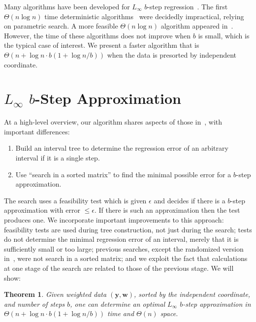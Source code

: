 \documentclass[11pt]{article}
\newtheorem{theorem}{Theorem}
\renewcommand{\vec}[1]{\ensuremath{\mathbf{#1}}}
\newcommand{\data}{\ensuremath{(\vec{y},\vec{w})}}
\begin{document}
Many algorithms have been developed for $L_\infty$ $b$-step regression~\cite{ChenWangPiecewise2013,ChenWangnlogn2013,DiazBanezLinearDecide,FournierVigneronLinftyStep,FournierVigneronLinftyParametric,FulopPrillLinftyStep,GuhaShimLinftyHistogram,JQReducedIso_IF2012,KarrasetalHistogramDuality,LiuRandomizedLinftyReduced,MaysterLopezStep}.
The first $\Theta(n \log n)$ time deterministic algorithms~\cite{FournierVigneronLinftyParametric,JQReducedIso_IF2012} were decidedly impractical, relying on parametric search.
A more feasible $\Theta(n \log n)$ algorithm appeared in~\cite{ChenWangnlogn2013}.
However, the time of these algorithms does not improve when $b$ is small, which is the typical case of interest.
We present a faster algorithm that is $\Theta(n + \log n \cdot b(1+\log n/b))$ when the data is presorted by independent coordinate.


\vspace*{-0.055in}
\section{$L_\infty$ $b$-Step Approximation} \label{sec:Linfty}
\vspace*{-0.055in}

At a high-level overview, our algorithm shares aspects of those in~\cite{ChenWangPiecewise2013,FournierVigneronLinftyStep,GuhaShimLinftyHistogram}, with important differences:
\vspace*{-0.05in}
\begin{enumerate}
\item Build an interval tree to determine the regression error of an arbitrary interval if it is a single step.
\vspace*{-0.05in}
\item Use ``search in a sorted matrix'' to find the minimal possible error for a $b$-step approximation.
\end{enumerate}
\vspace*{-0.05in}
The search uses a feasibility test which is given $\epsilon$ and decides if there is a $b$-step approximation with error $\leq \epsilon$.
If there is such an approximation then the test produces one.
We incorporate important improvements to this approach: feasibility tests are used during tree construction, not just during the search; tests do not determine the minimal regression error of an interval, merely that it is sufficiently small or too large; previous searches, except the randomized version in~\cite{LiuRandomizedLinftyReduced}, were not search in a sorted matrix; and we exploit the fact that calculations at one stage of the search are related to those of the previous stage.
We will show:
\begin{theorem} \label{thm:mainresult}
Given weighted data \data, sorted by the independent coordinate, and number of steps $b$, one can determine an optimal $L_\infty$ $b$-step approximation 
in $\Theta(n + \log n \cdot b (1+\log n/b))$ time and $\Theta(n)$ space.
\end{theorem}
\end{document}
